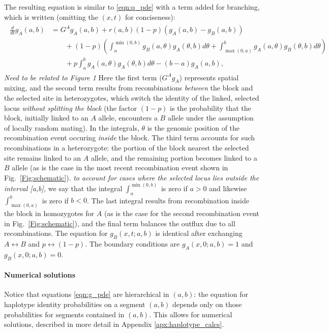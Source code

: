 \documentclass[11pt,letterpaper]{article}
\newcommand{\alisa}[1]{{\em \color{red} #1}}
\begin{document}
The resulting equation is similar to \eqref{eqn:q_pde} with a term added for branching,
which is written (omitting the $(x,t)$ for conciseness):
\begin{align}
    \begin{aligned} \label{eqn:g_pde}
        \frac{d}{dt} g_A(a,b) 
        &= G^A g_A(a,b) + r(a,b) (1-p) (g_A(a,b)-g_B(a,b))
            \\ {} & \qquad 
            + (1-p) \left( 
                \int_a^{\min(0,b)} g_B(a,\theta) g_A(\theta,b) d\theta
                + \int_{\max(0,a)}^b g_A(a,\theta) g_B(\theta,b) d\theta 
            \right)
            \\ {} & \qquad 
            + p \int_a^b {
                g_A(a,\theta) g_A(\theta,b) 
            } d\theta
            - (b-a) g_A(a,b)  ,
    \end{aligned} 
\end{align}
\alisa{Need to be related to Figure 1}
Here the first term ($G^A g_A$) represents spatial mixing,
and the second term results from recombinations \emph{between} the block and the selected site 
in heterozygotes, which switch the identity of the linked, selected locus \alisa{without splitting the block}
(the factor $(1-p)$ is the probability that the block, initially linked to an $A$ allele, encounters a $B$ allele
under the assumption of locally random mating).
In the integrals, $\theta$ is the genomic position of the recombination event occuring \emph{inside} the block.
The third term accounts for such recombinations in a heterozygote: 
the portion of the block nearest the selected site remains linked to an $A$ allele, 
and the remaining portion becomes linked to a $B$ allele (as is the case in the most recent recombination event shown in Fig.~\ref{Fig:schematic}).
\alisa{to account for cases where the selected locus lies outside the interval [a,b],} 
we say that the integral $\int_a^{\min(0,b)}$ is zero if  $a>0$ 
and likewise $\int_{\max(0,a)}^b$ is zero if $b<0$.
The last integral results from recombination inside the block in homozygotes for $A$ (as is the case for the second recombination event in Fig.~\ref{Fig:schematic}),
and the final term balances the outflux due to all recombinations.
The equation for $g_B(x,t;a,b)$ is identical after exchanging $A \leftrightarrow B$ and
$p \leftrightarrow (1-p)$.
The boundary conditions are $g_A(x,0;a,b)=1$ and $g_B(x,0;a,b)=0$.

\paragraph{Numerical solutions}
Notice that equations \eqref{eqn:g_pde}
are hierarchical in $(a,b)$:
the equation for haplotype identity probabilities on a segment $(a,b)$ depends only on those probabilities for segments contained in $(a,b)$.
This allows for numerical solutions, %
described in more detail in Appendix \ref{apx:haplotype_calcs}.
\end{document}
